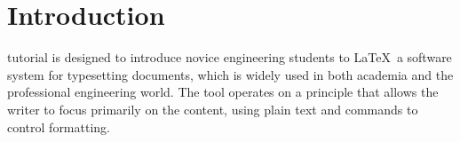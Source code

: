\documentclass[12pt,journal,compsoc]{IEEEtran}
\begin{document}
\section{Introduction}
%
%



% 
% 
% 
% 

 tutorial is designed to introduce novice engineering students to \LaTeX\, a software system for typesetting documents, which is widely used in both academia and the professional engineering world. The tool operates on a principle that allows the writer to focus primarily on the content, using plain text and commands to control formatting.
\end{document}
